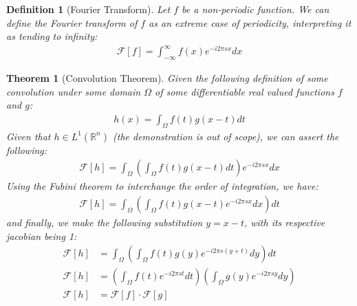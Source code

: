 \documentclass[12pt]{article}
\newtheorem{theorem}{Theorem}
\newtheorem{definition}{Definition}
\begin{document}
\begin{definition}[Fourier Transform]
    Let $f$ be a non-periodic function. We can define the Fourier transform of $f$ as an extreme case of periodicity, interpreting it as tending to infinity:
    \begin{align*}
        \mathcal{F}[f] = \int_{-\infty}^{\infty} f(x) e^{- i 2 \pi s x} dx
    \end{align*}
\end{definition}

\begin{theorem} [Convolution Theorem]
    Given the following definition of some convolution under some domain $\Omega$ of some differentiable real valued functions $f$ and $g$:
    \begin{align*}
        h(x) = \int_{\Omega} f(t) g(x - t) dt
    \end{align*}
Given that $h \in L^1\left( \mathbb{R}^n\right)$ (the demonstration is out of scope), we can assert the following:
\begin{align*}
    \mathcal{F}[h] = \int_{\Omega} \left(\int_{\Omega} f(t) g(x - t) dt \right)e^{-i 2 \pi s x} dx
\end{align*}
Using the Fubini theorem to interchange the order of integration, we have:
\begin{align*}
    \mathcal{F}[h] = \int_{\Omega} \left(\int_{\Omega} f(t) g(x - t) e^{-i 2 \pi s x} dx\right) dt
\end{align*}
and finally, we make the following substitution $y = x - t$, with its respective jacobian being 1:
\begin{align*}
    \mathcal{F}[h] &= \int_{\Omega} \left(\int_{\Omega} f(t) g(y) e^{-i 2 \pi s (y + t)} dy\right) dt \\
    \mathcal{F}[h] &= \left(\int_{\Omega} f(t) e^{-i 2 \pi s t} dt \right) \left(\int_{\Omega} g(y) e^{-i 2 \pi s y} dy \right) \\
    \mathcal{F}[h] &= \mathcal{F}[f] \cdot \mathcal{F}[g]
\end{align*}
\end{theorem}
\end{document}
